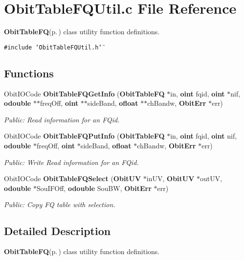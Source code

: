 \section{Obit\-Table\-FQUtil.c File Reference}
\label{ObitTableFQUtil_8c}
{\bf Obit\-Table\-FQ}{\rm (p.\,\pageref{structObitTableFQ})} class utility function definitions. 

{\tt \#include \char`\"{}Obit\-Table\-FQUtil.h\char`\"{}}\par
\subsection*{Functions}
\begin{CompactItemize}
\item 
Obit\-IOCode {\bf Obit\-Table\-FQGet\-Info} ({\bf Obit\-Table\-FQ} $\ast$in, {\bf oint} fqid, {\bf oint} $\ast$nif, {\bf odouble} $\ast$$\ast$freq\-Off, {\bf oint} $\ast$$\ast$side\-Band, {\bf ofloat} $\ast$$\ast$ch\-Bandw, {\bf Obit\-Err} $\ast$err)
\begin{CompactList}\small\item\em Public: Read information for an FQid. \item\end{CompactList}\item 
Obit\-IOCode {\bf Obit\-Table\-FQPut\-Info} ({\bf Obit\-Table\-FQ} $\ast$in, {\bf oint} fqid, {\bf oint} nif, {\bf odouble} $\ast$freq\-Off, {\bf oint} $\ast$side\-Band, {\bf ofloat} $\ast$ch\-Bandw, {\bf Obit\-Err} $\ast$err)
\begin{CompactList}\small\item\em Public: Write Read information for an FQid. \item\end{CompactList}\item 
Obit\-IOCode {\bf Obit\-Table\-FQSelect} ({\bf Obit\-UV} $\ast$in\-UV, {\bf Obit\-UV} $\ast$out\-UV, {\bf odouble} $\ast$Sou\-IFOff, {\bf odouble} Sou\-BW, {\bf Obit\-Err} $\ast$err)
\begin{CompactList}\small\item\em Public: Copy FQ table with selection. \item\end{CompactList}\end{CompactItemize}


\subsection{Detailed Description}
{\bf Obit\-Table\-FQ}{\rm (p.\,\pageref{structObitTableFQ})} class utility function definitions. 



